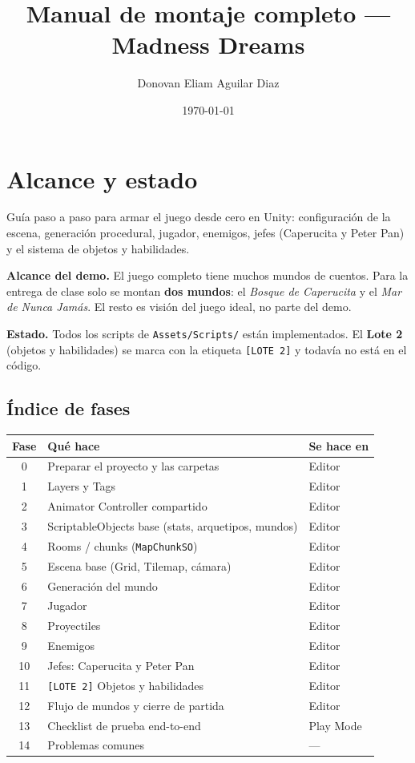 \documentclass[a4paper,12pt]{article}
\title{Manual de montaje completo --- Madness Dreams}
\author{Donovan Eliam Aguilar Diaz}
\date{\today}
\newcommand{\code}[1]{\texttt{#1}}
\begin{document}
\maketitle
\tableofcontents
\newpage

\section*{Alcance y estado}

Guía paso a paso para armar el juego desde cero en Unity: configuración de la escena,
generación procedural, jugador, enemigos, jefes (Caperucita y Peter Pan) y el sistema de
objetos y habilidades.

\textbf{Alcance del demo.} El juego completo tiene muchos mundos de cuentos. Para la entrega de
clase solo se montan \textbf{dos mundos}: el \emph{Bosque de Caperucita} y el \emph{Mar de Nunca
Jamás}. El resto es visión del juego ideal, no parte del demo.

\textbf{Estado.} Todos los scripts de \code{Assets/Scripts/} están implementados. El
\textbf{Lote 2} (objetos y habilidades) se marca con la etiqueta \code{[LOTE 2]} y todavía no
está en el código.

\subsection*{Índice de fases}

\begin{center}
\begin{longtable}{|c|p{7.2cm}|l|}
\hline
\textbf{Fase} & \textbf{Qué hace} & \textbf{Se hace en} \\
\hline
\endhead
0 & Preparar el proyecto y las carpetas & Editor \\
\hline
1 & Layers y Tags & Editor \\
\hline
2 & Animator Controller compartido & Editor \\
\hline
3 & ScriptableObjects base (stats, arquetipos, mundos) & Editor \\
\hline
4 & Rooms / chunks (\code{MapChunkSO}) & Editor \\
\hline
5 & Escena base (Grid, Tilemap, cámara) & Editor \\
\hline
6 & Generación del mundo & Editor \\
\hline
7 & Jugador & Editor \\
\hline
8 & Proyectiles & Editor \\
\hline
9 & Enemigos & Editor \\
\hline
10 & Jefes: Caperucita y Peter Pan & Editor \\
\hline
11 & \code{[LOTE 2]} Objetos y habilidades & Editor \\
\hline
12 & Flujo de mundos y cierre de partida & Editor \\
\hline
13 & Checklist de prueba end-to-end & Play Mode \\
\hline
14 & Problemas comunes & --- \\
\hline
\end{longtable}
\end{center}
\end{document}
